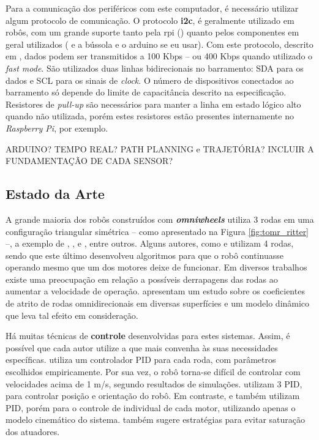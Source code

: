 
Para a comunicação dos periféricos com este computador, é necessário utilizar algum protocolo de comunicação. O protocolo \textbf{\acrlong{i2c}}, é geralmente utilizado em robôs, com um grande suporte tanto pela \acrshort{rpi} (\cite{upton2014raspberry}) quanto pelos componentes em geral utilizados (\cite{MPU6050} e a bússola e o arduino se eu usar). Com este protocolo, descrito em \cite{semiconductors2000i2c}, dados podem ser transmitidos a 100 Kbps -- ou 400 Kbps quando utilizado o \emph{fast mode}. São utilizados duas linhas bidirecionais no barramento: SDA para os dados e SCL para os sinais de \emph{clock}. O número de dispositivos conectados ao barramento só depende do limite de capacitância descrito na especificação. Resistores de \emph{pull-up} são necessários para manter a linha em estado lógico alto quando não utilizada, porém estes resistores estão presentes internamente no \emph{Raspberry Pi}, por exemplo.

ARDUINO? TEMPO REAL? PATH PLANNING e TRAJETÓRIA? INCLUIR A FUNDAMENTAÇÃO DE CADA SENSOR?

\subsection{Estado da Arte}

A grande maioria dos robôs construídos com \textbf{\emph{omniwheels}} utiliza 3 rodas em uma configuração triangular simétrica -- como apresentado na Figura \ref{fig:tomr_ritter} --, a exemplo de \cite{ritter2016modelagem}, \cite{samani2007comprehensive}, \cite{williams2002dynamic} e \cite{indiveri2009swedish}, entre outros. Alguns autores, como \cite{krinkin2015design} e \cite{rojas2006holonomic} utilizam 4 rodas, sendo que este último desenvolveu algoritmos para que o robô continuasse operando mesmo que um dos motores deixe de funcionar. Em diversos trabalhos existe uma preocupação em relação a possíveis derrapagens das rodas ao aumentar a velocidade de operação. \cite{williams2002dynamic} apresentam um estudo sobre os coeficientes de atrito de rodas omnidirecionais em diversas superfícies e um modelo dinâmico que leva tal efeito em consideração.

Há muitas técnicas de \textbf{controle} desenvolvidas para estes sistemas. Assim, é possível que cada autor utilize a que mais convenha às suas necessidades específicas. \cite{ritter2016modelagem} utiliza um controlador PID para cada roda, com parâmetros escolhidos empiricamente. Por sua vez, o robô torna-se difícil de controlar com velocidades acima de 1 m/s, segundo resultados de simulações. \cite{samani2007comprehensive} utilizam 3 PID, para controlar posição e orientação do robô. Em contraste, \cite{rojas2006holonomic} e \cite{indiveri2009swedish} também utilizam PID, porém para o controle de individual de cada motor, utilizando apenas o modelo cinemático do sistema. \cite{indiveri2009swedish} também sugere estratégias para evitar saturação dos atuadores.

